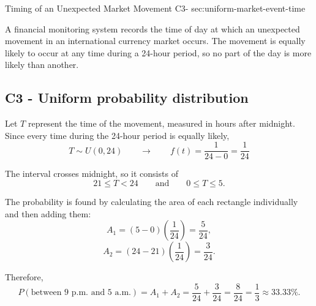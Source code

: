 	
	\sectionScored
	{Timing of an Unexpected Market Movement}
	{C3-}
	{sec:uniform-market-event-time}
	{
		A financial monitoring system records the time of day at which an
		unexpected movement in an international currency market occurs. The
		movement is equally likely to occur at any time during a 24-hour period,
		so no part of the day is more likely than another.
		
		
		\label{subsec:uniform-market-event-time-probability}
		\subsection*{C3 - Uniform probability distribution }
		
		Let \(T\) represent the time of the movement, measured in hours after
		midnight. Since every time during the 24-hour period is equally likely,
		\[
		T\sim U(0,24) \qquad \longrightarrow \qquad 
		f(t)=\frac1{24 - 0}=\frac1{24}
		\]
		

		The interval crosses midnight, so it consists of
		\[
		21\le T<24
		\qquad\text{and}\qquad
		0\le T\le5.
		\]
		
		The probability is found by calculating the area of each rectangle
		individually and then adding them:
		\[
		A_1=(5-0)\left(\frac1{24}\right)
		=\frac5{24},
		\]
		\[
		A_2=(24-21)\left(\frac1{24}\right)
		=\frac3{24}.
		\]
		
		Therefore,
		\[
		P(\text{between 9 p.m. and 5 a.m.})
		=
		A_1+A_2
		=
		\frac5{24}+\frac3{24}
		= \frac8{24} = 
		\boxed{\frac13\approx33.33\%}.
		\]
		
		}
